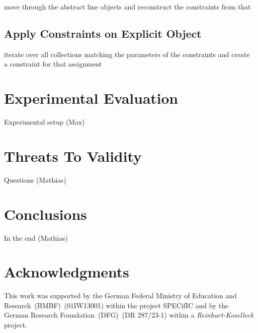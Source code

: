 \documentclass[conference]{IEEEtran}
\begin{document}
\danger move through the abstract line objects and reconstruct the constraints
from that

\subsection{Apply Constraints on Explicit Object}
\label{sec:impl_applying}

\danger iterate over all collections matching the parameters of the constraints
and create a constraint for that assignment

\section{Experimental Evaluation}
\label{sec:exper-eval}

\danger Experimental setup (Max)

\section{Threats To Validity}
\label{sec:threats-validity}

\danger Questions (Mathias)

\section{Conclusions}
\label{sec:conclusions}

\danger In the end (Mathias)

\section*{Acknowledgments}
\label{sec:acknowledgments}
This work was supported by the German Federal Ministry of Education and
Research~(BMBF)~(01IW13001) within the project SPECifIC and by the German
Research Foundation~(DFG)~(DR 287/23-1) within a \emph{Reinhart-Koselleck}
project.


%
%
\end{document}
